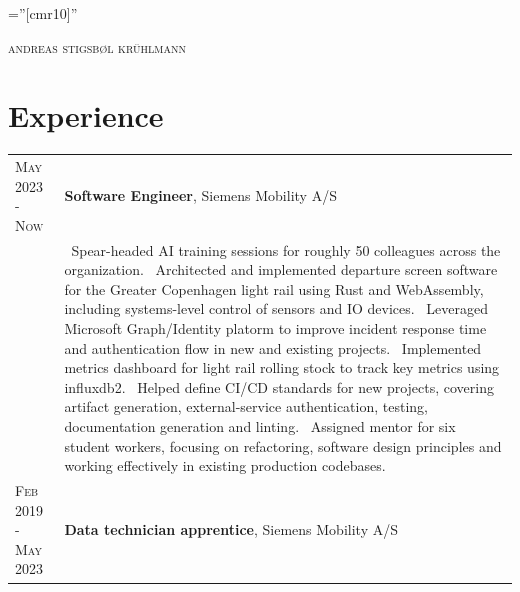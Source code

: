 \documentclass[a4paper,10pt]{article}
\begin{document}
\pagestyle{empty}

\font\fb=''[cmr10]''

\par{\centering
	{\Huge \textsc{andreas stigsb\o l kr\"uhlmann}
	}\bigskip\par}

\begin{center}
\end{center}

\section{Experience}
\begin{tabular}{@{}p{3.4cm}p{12.9cm}@{}}
	\textsc{May 2023 - Now}      & \textbf{Software Engineer}, Siemens Mobility A/S                                                                                                                                    \\
	                             & \footnotesize{\textbullet\ Spear-headed AI training sessions for roughly 50 colleagues across the organization.\newline
		\textbullet\ Architected and implemented departure screen software for the Greater Copenhagen light rail using Rust and WebAssembly, including systems-level control of sensors and IO devices.\newline
		\textbullet\ Leveraged Microsoft Graph/Identity platorm to improve incident response time and authentication flow in new and existing projects.\newline
		\textbullet\ Implemented metrics dashboard for light rail rolling stock to track key metrics using influxdb2.\newline
		\textbullet\ Helped define CI/CD standards for new projects, covering artifact generation, external-service authentication, testing, documentation generation and linting.\newline
	\textbullet\ Assigned mentor for six student workers, focusing on refactoring, software design principles and working effectively in existing production codebases.}                                               \\[5pt]
	\textsc{Feb 2019 - May 2023} & \textbf{Data technician apprentice}, Siemens Mobility A/S                                                                                                                           \\

\end{tabular}
\end{document}
